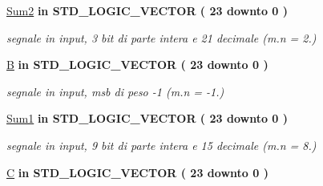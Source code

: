 \begin{DoxyCompactItemize}
\hyperlink{group___linear_regression_ga4c98819455589b84c5e250a97e9bdfa1}{Sum2}  {\bfseries {\bfseries \textcolor{vhdlchar}{in}\textcolor{vhdlchar}{ }}} {\bfseries \textcolor{vhdlchar}{S\+T\+D\+\_\+\+L\+O\+G\+I\+C\+\_\+\+V\+E\+C\+T\+O\+R}\textcolor{vhdlchar}{ }\textcolor{vhdlchar}{(}\textcolor{vhdlchar}{ }\textcolor{vhdlchar}{ } \textcolor{vhdldigit}{23} \textcolor{vhdlchar}{ }\textcolor{vhdlchar}{downto}\textcolor{vhdlchar}{ }\textcolor{vhdlchar}{ } \textcolor{vhdldigit}{0} \textcolor{vhdlchar}{ }\textcolor{vhdlchar}{)}\textcolor{vhdlchar}{ }} 
\begin{DoxyCompactList}\small\item\em segnale in input, 3 bit di parte intera e 21 decimale (m.\+n = 2.) \end{DoxyCompactList}\item 
\hyperlink{group___linear_regression_gab6685be06ffd9f2425d01307287a4454}{B}  {\bfseries {\bfseries \textcolor{vhdlchar}{in}\textcolor{vhdlchar}{ }}} {\bfseries \textcolor{vhdlchar}{S\+T\+D\+\_\+\+L\+O\+G\+I\+C\+\_\+\+V\+E\+C\+T\+O\+R}\textcolor{vhdlchar}{ }\textcolor{vhdlchar}{(}\textcolor{vhdlchar}{ }\textcolor{vhdlchar}{ } \textcolor{vhdldigit}{23} \textcolor{vhdlchar}{ }\textcolor{vhdlchar}{downto}\textcolor{vhdlchar}{ }\textcolor{vhdlchar}{ } \textcolor{vhdldigit}{0} \textcolor{vhdlchar}{ }\textcolor{vhdlchar}{)}\textcolor{vhdlchar}{ }} 
\begin{DoxyCompactList}\small\item\em segnale in input, msb di peso -\/1 (m.\+n = -\/1.) \end{DoxyCompactList}\item 
\hyperlink{group___linear_regression_ga43a9a0da4f44006af5631ed5ee8ad924}{Sum1}  {\bfseries {\bfseries \textcolor{vhdlchar}{in}\textcolor{vhdlchar}{ }}} {\bfseries \textcolor{vhdlchar}{S\+T\+D\+\_\+\+L\+O\+G\+I\+C\+\_\+\+V\+E\+C\+T\+O\+R}\textcolor{vhdlchar}{ }\textcolor{vhdlchar}{(}\textcolor{vhdlchar}{ }\textcolor{vhdlchar}{ } \textcolor{vhdldigit}{23} \textcolor{vhdlchar}{ }\textcolor{vhdlchar}{downto}\textcolor{vhdlchar}{ }\textcolor{vhdlchar}{ } \textcolor{vhdldigit}{0} \textcolor{vhdlchar}{ }\textcolor{vhdlchar}{)}\textcolor{vhdlchar}{ }} 
\begin{DoxyCompactList}\small\item\em segnale in input, 9 bit di parte intera e 15 decimale (m.\+n = 8.) \end{DoxyCompactList}\item 
\hyperlink{group___linear_regression_ga17058a6bcb609074c49be51d09202870}{C}  {\bfseries {\bfseries \textcolor{vhdlchar}{in}\textcolor{vhdlchar}{ }}} {\bfseries \textcolor{vhdlchar}{S\+T\+D\+\_\+\+L\+O\+G\+I\+C\+\_\+\+V\+E\+C\+T\+O\+R}\textcolor{vhdlchar}{ }\textcolor{vhdlchar}{(}\textcolor{vhdlchar}{ }\textcolor{vhdlchar}{ } \textcolor{vhdldigit}{23} \textcolor{vhdlchar}{ }\textcolor{vhdlchar}{downto}\textcolor{vhdlchar}{ }\textcolor{vhdlchar}{ } \textcolor{vhdldigit}{0} \textcolor{vhdlchar}{ }\textcolor{vhdlchar}{)}\textcolor{vhdlchar}{ }} 

\end{DoxyCompactItemize}
